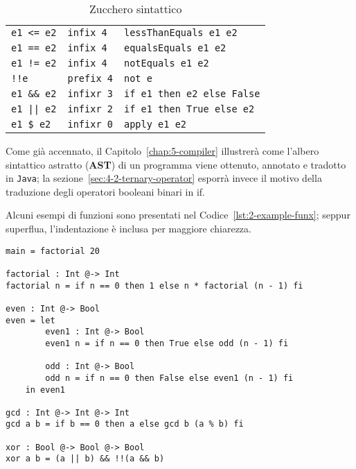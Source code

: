 \begin{table}[H]
\begin{center}
\begin{tabularx}{\textwidth}{|P{7em}@{\quad}P{7em}|X|}
            \texttt{e1 <= e2}            & \texttt{infix 4}  & \texttt{lessThanEquals e1 e2}     \\
            \texttt{e1 == e2}            & \texttt{infix 4}  & \texttt{equalsEquals e1 e2}       \\
            \texttt{e1 != e2}            & \texttt{infix 4}  & \texttt{notEquals e1 e2}          \\
            \texttt{!!e}                 & \texttt{prefix 4} & \texttt{not e}                    \\
            \texttt{e1 \&\& e2}          & \texttt{infixr 3} & \texttt{if e1 then e2 else False} \\
            \texttt{e1 || e2}            & \texttt{infixr 2} & \texttt{if e1 then True else e2}  \\
            \texttt{e1 \$ e2}            & \texttt{infixr 0} & \texttt{apply e1 e2}              \\
            \hline
        \end{tabularx}
    \end{center}
    \caption{Zucchero sintattico}
    \label{tab:2-sugar}
\end{table}

\newpage

\noindent Come già accennato, il Capitolo~\ref{chap:5-compiler} illustrerà come l'albero sintattico astratto (\textbf{AST})
di un programma viene ottenuto, annotato e tradotto in \texttt{Java}; la sezione~\ref{sec:4-2-ternary-operator}
esporrà invece il motivo della traduzione degli operatori booleani binari in if.

\noindent Alcuni esempi di funzioni sono presentati nel Codice~\ref{lst:2-example-funx};
seppur superflua, l'indentazione è inclusa per maggiore chiarezza.

\vspace{4mm}
\begin{lstlisting}[caption={Esempio di programma}, style=funxCode, label={lst:2-example-funx}]
main = factorial 20

factorial : Int @-> Int
factorial n = if n == 0 then 1 else n * factorial (n - 1) fi

even : Int @-> Bool
even = let
        even1 : Int @-> Bool
        even1 n = if n == 0 then True else odd (n - 1) fi

        odd : Int @-> Bool
        odd n = if n == 0 then False else even1 (n - 1) fi
    in even1

gcd : Int @-> Int @-> Int
gcd a b = if b == 0 then a else gcd b (a % b) fi

xor : Bool @-> Bool @-> Bool
xor a b = (a || b) && !!(a && b)
\end{lstlisting}